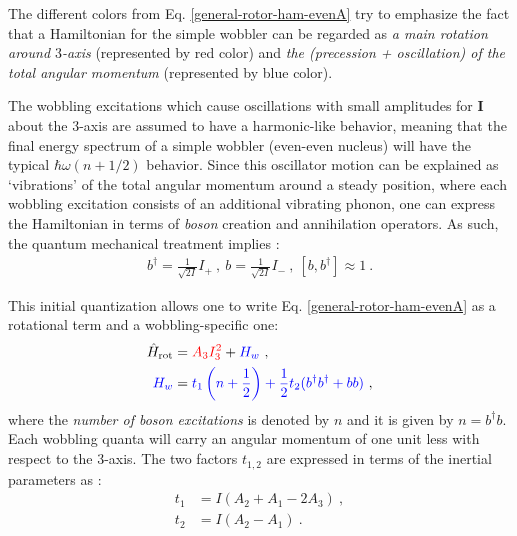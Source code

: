 The different colors from Eq. \ref{general-rotor-ham-evenA} try to emphasize the fact that a Hamiltonian for the simple wobbler can be regarded as \emph{a main rotation around $3$-axis} (represented by red color) and \emph{the (precession + oscillation) of the total angular momentum} (represented by blue color).

The wobbling excitations which cause oscillations with small amplitudes for $\mathbf{I}$ about the $3$-axis are assumed to have a harmonic-like behavior, meaning that the final energy spectrum of a simple wobbler (even-even nucleus) will have the typical $\hbar\omega(n+1/2)$ behavior. Since this oscillator motion can be explained as `vibrations' of the total angular momentum around a steady position, where each wobbling excitation consists of an additional vibrating phonon, one can express the Hamiltonian in terms of \emph{boson} creation and annihilation operators. As such, the quantum mechanical treatment implies \cite{bohr1998nuclear}:
\begin{align}
    b^\dagger=\frac{1}{\sqrt{2I}}I_+\ ,\ b=\frac{1}{\sqrt{2I}}I_-\ ,\ \left[b,b^\dagger\right]\approx 1\ .
\end{align}

This initial quantization allows one to write Eq. \ref{general-rotor-ham-evenA} as a rotational term and a wobbling-specific one:
\begin{align}
    \hat{H}_\text{rot}&={\color{red}A_3I_3^2}+{\color{blue}H_w}\ ,\label{rot-ham-non-diagonal} \\
    {\color{blue}H_w}&={\color{blue}t_1\left(n+\frac{1}{2}\right)+\frac{1}{2}t_2(b^\dagger b^\dagger + bb)}\ ,
    \label{wob-ham-non-diagonal}
\end{align}
where the \emph{number of boson excitations} is denoted by $n$ and it is given by $n=b^\dagger b$. Each wobbling quanta will carry an angular momentum of one unit less with respect to the $3$-axis. The two factors $t_{1,2}$ are expressed in terms of the inertial parameters as \cite{bohr1998nuclear}:
\begin{align}
    t_1&=I(A_2+A_1-2A_3)\ , \\
    t_2&=I(A_2-A_1)\ .
\end{align}

